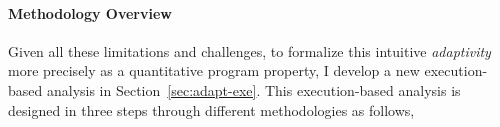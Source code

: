 \paragraph{Methodology Overview}
Given all these limitations and challenges,
to formalize this intuitive \emph{adaptivity} more precisely as a quantitative program property, 
I develop a new execution-based analysis in Section~\ref{sec:adapt-exe}.
 This execution-based analysis is designed in three steps through different methodologies as follows,
